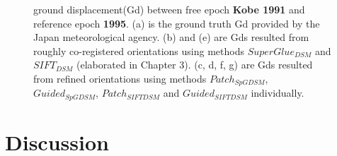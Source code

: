 \begin{figure}[htbp]
\begin{center}
		\caption{{\scriptsize ground displacement(Gd) between free epoch \textbf{Kobe 1991} and reference epoch \textbf{1995}. (a) is the ground truth Gd provided by the Japan meteorological agency. (b) and (e) are Gds resulted from roughly co-registered orientations using methods $SuperGlue_{DSM}$ and $SIFT_{DSM}$ (elaborated in Chapter 3). (c, d, f, g) are Gds resulted from refined orientations using methods $Patch_{SpGDSM}$, $Guided_{SpGDSM}$, $Patch_{SIFTDSM}$ and $Guided_{SIFTDSM}$ individually.}}
		\label{GdKobe}
	\end{center}
\end{figure} 

\section{Discussion}
